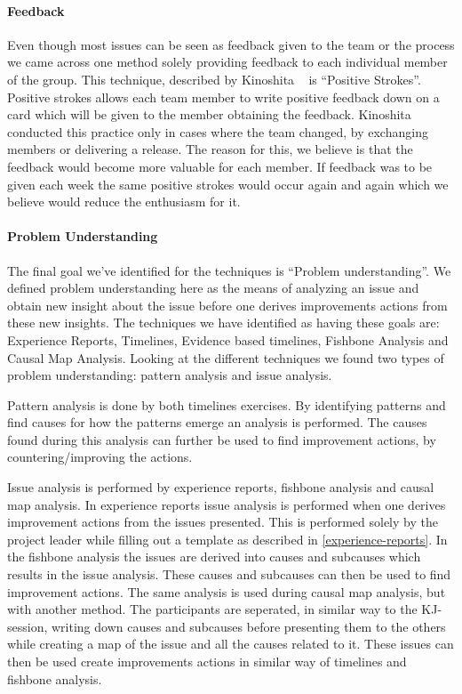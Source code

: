 \documentclass[12pt]{article}
\begin{document}
\paragraph{Feedback}
Even though most issues can be seen as feedback given to the team or the process we came across one method solely providing feedback to each individual member of the group. This technique, described by Kinoshita ~\cite{Kinoshita2008} is ``Positive Strokes''. Positive strokes allows each team member to write positive feedback down on a card which will be given to the member obtaining the feedback. Kinoshita conducted this practice only in cases where the team changed, by exchanging members or delivering a release. The reason for this, we believe is that the feedback would become more valuable for each member. If feedback was to be given each week the same positive strokes would occur again and again which we believe would reduce the enthusiasm for it. 

\paragraph{Problem Understanding}
The final goal we've identified for the techniques is ``Problem understanding''. We defined problem understanding here as the means of analyzing an issue and obtain new insight about the issue before one derives improvements actions from these new insights. The techniques we have identified as having these goals are: Experience Reports, Timelines, Evidence based timelines, Fishbone Analysis and Causal Map Analysis. Looking at the different techniques we found two types of problem understanding: pattern analysis and issue analysis. 

Pattern analysis is done by both timelines exercises. By identifying patterns and find causes for how the patterns emerge an analysis is performed. The causes found during this analysis can further be used to find improvement actions, by countering/improving the actions.

Issue analysis is performed by experience reports, fishbone analysis and causal map analysis. In experience reports issue analysis is performed when one derives improvement actions from the issues presented. This is performed solely by the project leader while filling out a template as described in \autoref{experience-reports}. In the fishbone analysis the issues are derived into causes and subcauses which results in the issue analysis. These causes and subcauses can then be used to find improvement actions. The same analysis is used during causal map analysis, but with another method. The participants are seperated, in similar way to the KJ-session, writing down causes and subcauses before presenting them to the others while creating a map of the issue and all the causes related to it. These issues can then be used create improvements actions in similar way of timelines and fishbone analysis. 
\end{document}
